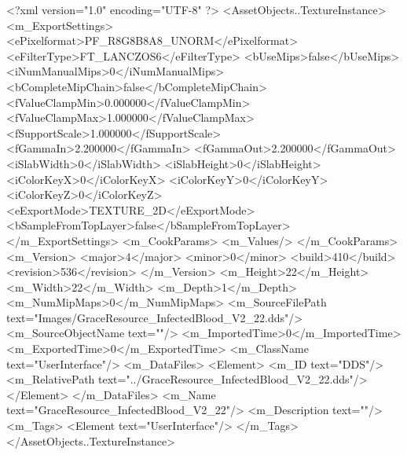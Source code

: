 <?xml version="1.0" encoding="UTF-8" ?>
<AssetObjects..TextureInstance>
	<m_ExportSettings>
		<ePixelformat>PF_R8G8B8A8_UNORM</ePixelformat>
		<eFilterType>FT_LANCZOS6</eFilterType>
		<bUseMips>false</bUseMips>
		<iNumManualMips>0</iNumManualMips>
		<bCompleteMipChain>false</bCompleteMipChain>
		<fValueClampMin>0.000000</fValueClampMin>
		<fValueClampMax>1.000000</fValueClampMax>
		<fSupportScale>1.000000</fSupportScale>
		<fGammaIn>2.200000</fGammaIn>
		<fGammaOut>2.200000</fGammaOut>
		<iSlabWidth>0</iSlabWidth>
		<iSlabHeight>0</iSlabHeight>
		<iColorKeyX>0</iColorKeyX>
		<iColorKeyY>0</iColorKeyY>
		<iColorKeyZ>0</iColorKeyZ>
		<eExportMode>TEXTURE_2D</eExportMode>
		<bSampleFromTopLayer>false</bSampleFromTopLayer>
	</m_ExportSettings>
	<m_CookParams>
		<m_Values/>
	</m_CookParams>
	<m_Version>
		<major>4</major>
		<minor>0</minor>
		<build>410</build>
		<revision>536</revision>
	</m_Version>
	<m_Height>22</m_Height>
	<m_Width>22</m_Width>
	<m_Depth>1</m_Depth>
	<m_NumMipMaps>0</m_NumMipMaps>
	<m_SourceFilePath text="Images/GraceResource_InfectedBlood_V2_22.dds"/>
	<m_SourceObjectName text=""/>
	<m_ImportedTime>0</m_ImportedTime>
	<m_ExportedTime>0</m_ExportedTime>
	<m_ClassName text="UserInterface"/>
	<m_DataFiles>
		<Element>
			<m_ID text="DDS"/>
			<m_RelativePath text="../GraceResource_InfectedBlood_V2_22.dds"/>
		</Element>
	</m_DataFiles>
	<m_Name text="GraceResource_InfectedBlood_V2_22"/>
	<m_Description text=""/>
	<m_Tags>
		<Element text="UserInterface"/>
	</m_Tags>
</AssetObjects..TextureInstance>
